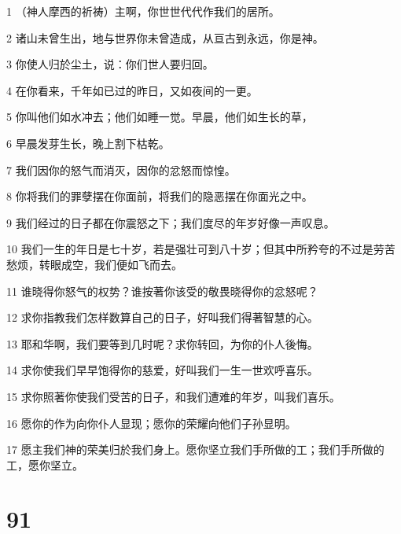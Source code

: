 \par 1 （神人摩西的祈祷）主啊，你世世代代作我们的居所。
\par 2 诸山未曾生出，地与世界你未曾造成，从亘古到永远，你是神。
\par 3 你使人归於尘土，说：你们世人要归回。
\par 4 在你看来，千年如已过的昨日，又如夜间的一更。
\par 5 你叫他们如水冲去；他们如睡一觉。早晨，他们如生长的草，
\par 6 早晨发芽生长，晚上割下枯乾。
\par 7 我们因你的怒气而消灭，因你的忿怒而惊惶。
\par 8 你将我们的罪孽摆在你面前，将我们的隐恶摆在你面光之中。
\par 9 我们经过的日子都在你震怒之下；我们度尽的年岁好像一声叹息。
\par 10 我们一生的年日是七十岁，若是强壮可到八十岁；但其中所矜夸的不过是劳苦愁烦，转眼成空，我们便如飞而去。
\par 11 谁晓得你怒气的权势？谁按著你该受的敬畏晓得你的忿怒呢？
\par 12 求你指教我们怎样数算自己的日子，好叫我们得著智慧的心。
\par 13 耶和华啊，我们要等到几时呢？求你转回，为你的仆人後悔。
\par 14 求你使我们早早饱得你的慈爱，好叫我们一生一世欢呼喜乐。
\par 15 求你照著你使我们受苦的日子，和我们遭难的年岁，叫我们喜乐。
\par 16 愿你的作为向你仆人显现；愿你的荣耀向他们子孙显明。
\par 17 愿主我们神的荣美归於我们身上。愿你坚立我们手所做的工；我们手所做的工，愿你坚立。

\chapter{91}

